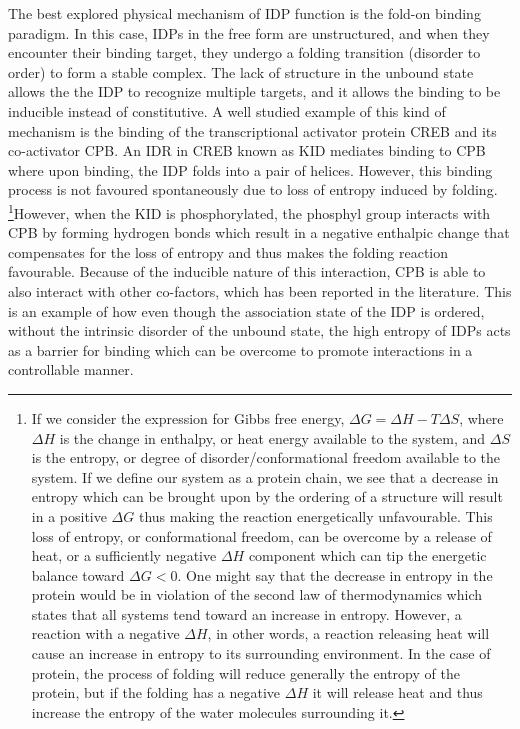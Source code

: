 The best explored physical mechanism of IDP function is the fold-on binding paradigm. In this case, IDPs in the free form are unstructured, and when they encounter their binding target, they undergo a folding transition (disorder to order) to form a stable complex. The lack of structure in the unbound state allows the the IDP to recognize multiple targets, and it allows the binding to be inducible instead of constitutive. A well studied example of this kind of mechanism is the binding of the transcriptional activator protein CREB and its co-activator CPB. An IDR in CREB known as KID mediates binding to CPB where upon binding, the IDP folds into a pair of helices. However, this binding process is not favoured spontaneously due to loss of entropy induced by folding. \footnote{If we consider the expression for Gibbs free energy, $\Delta G = \Delta H - T\Delta S$, where $\Delta H$ is the change in enthalpy, or heat energy available to the system, and $\Delta S$ is the entropy, or degree of disorder/conformational freedom available to the system. If we define our system as a protein chain, we see that a decrease in entropy which can be brought upon by the ordering of a structure will result in a positive $\Delta G$ thus making the reaction energetically unfavourable. This loss of entropy, or conformational freedom, can be overcome by a release of heat, or a sufficiently negative $\Delta H$ component which can tip the energetic balance toward $\Delta G < 0$. One might say that the decrease in entropy in the protein would be in violation of the second law of thermodynamics which states that all systems tend toward an increase in entropy. However, a reaction with a negative $\Delta H$, in other words, a reaction releasing heat will cause an increase in entropy to its surrounding environment. In the case of protein, the process of folding will reduce generally the entropy of the protein, but if the folding has a negative $\Delta H$ it will release heat and thus increase the entropy of the water molecules surrounding it.}However, when the KID is phosphorylated, the phosphyl group interacts with CPB by forming hydrogen bonds which result in a negative enthalpic change that compensates for the loss of entropy and thus makes the folding reaction favourable. Because of the inducible nature of this interaction, CPB is able to also interact with other co-factors, which has been reported in the literature. \cite{radhakrishnan1997solution} This is an example of how even though the association state of the IDP is ordered, without the intrinsic disorder of the unbound state, the high entropy of IDPs acts as a barrier for binding which can be overcome to promote interactions in a controllable manner. \\


